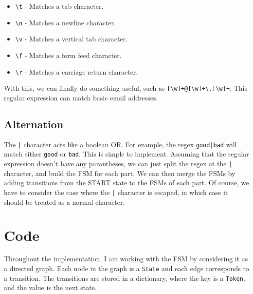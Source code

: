 \documentclass[12pt]{report}
\begin{document}
\begin{itemize}
    \item \texttt{\textbackslash t} - Matches a tab character.
    \item \texttt{\textbackslash n} - Matches a newline character.
    \item \texttt{\textbackslash v} - Matches a vertical tab character.
    \item \texttt{\textbackslash f} - Matches a form feed character.
    \item \texttt{\textbackslash r} - Matches a carriage return character.
\end{itemize}

With this, we can finally do something useful, such as \texttt{[\textbackslash w]+@[\textbackslash w]+\textbackslash .[\textbackslash w]+}. This regular expression can match basic email addresses.


\subsection{Alternation}

The \texttt{|} character acts like a boolean OR. For example, the regex \texttt{good|bad} will match either \texttt{good} or \texttt{bad}. This is simple to implement. Assuming that the regular expression doesn't have any parantheses, we can just split the regex at the \texttt{|} character, and build the FSM for each part. We can then merge the FSMs by adding transitions from the START state to the FSMs of each part. Of course, we have to consider the case where the \texttt{|} character is escaped, in which case it should be treated as a normal character.




\section{Code}

Throughout the implementation, I am working with the FSM by considering it as a directed graph. Each node in the graph is a \texttt{State} and each edge corresponds to a transition. The transitions are stored in a dictionary, where the key is a \texttt{Token}, and the value is the next state.
\end{document}
